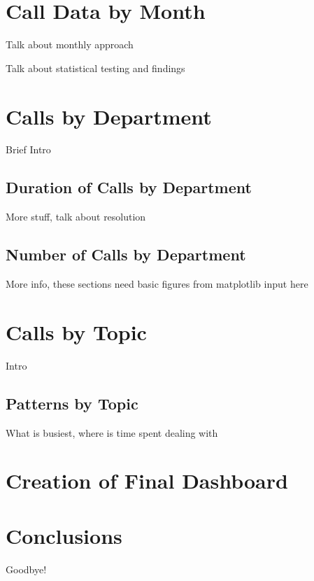 \documentclass[11pt,twocolumn]{article}
\begin{document}
\section{Call Data by Month}
Talk about monthly approach
\par
Talk about statistical testing and findings

\section{Calls by Department}
Brief Intro
\subsection{Duration of Calls by Department}
More stuff, talk about resolution
\subsection{Number of Calls by Department}
More info, these sections need basic figures from matplotlib input here

\section{Calls by Topic}
Intro
\subsection{Patterns by Topic}
What is busiest, where is time spent dealing with 


\section{Creation of Final Dashboard}

\section{Conclusions}

Goodbye!
\end{document}
